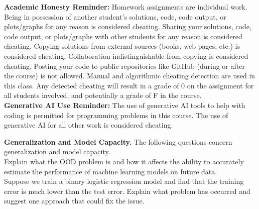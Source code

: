 \documentclass[11pt]{article}
\begin{document}
\textbf{Academic Honesty Reminder:} Homework assignments are individual work. Being in possession of another student's solutions, code, code output, or plots/graphs for any reason is considered cheating. Sharing your solutions, code, code output, or plots/graphs with other students for any reason is considered cheating. Copying solutions from external sources (books, web pages, etc.) is considered cheating. Collaboration indistinguishable from copying is considered cheating. Posting your code to public repositories like GitHub (during or after the course) is not allowed. Manual and algorithmic cheating detection are used in this class. Any detected cheating will result in a grade of 0 on the assignment for all students involved, and potentially a grade of F in the course. \\

\textbf{Generative AI Use Reminder:} The use of generative AI tools to help with coding is permitted for programming problems in this course. The use of generative AI for all other work is considered cheating.\\

\newpage

\begin{problem}{10}\textbf{Generalization and Model Capacity.} The following questions concern generalization and model capacity.\\

 Explain what the OOD problem is and how it affects the ability to accurately estimate the performance of machine learning models on future data.\\

 Suppose we train a binary logistic regression model and find that the training error is much lower than the test error. Explain what problem has occurred and suggest one approach that could fix the issue.

\end{problem}
\end{document}
